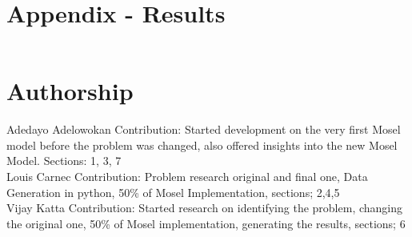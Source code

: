 \documentclass[a4paper,11pt]{article}
\begin{document}
\clearpage
\section*{Appendix - Results}



\begin{lstlisting}

\end{lstlisting}

\clearpage
\section*{Authorship}

Adedayo Adelowokan Contribution: Started development on the very first Mosel model before the problem was changed, also offered insights into the new Mosel Model. Sections: 1, 3, 7
 \\
\newline
Louis Carnec Contribution: Problem research original and final one, Data Generation in python, 50\% of Mosel Implementation, sections; 2,4,5 \\
\newline
Vijay Katta Contribution: Started research on identifying the problem, changing the original one, 50\% of Mosel implementation, generating the results, sections; 6 \\


\clearpage


\end{document}
